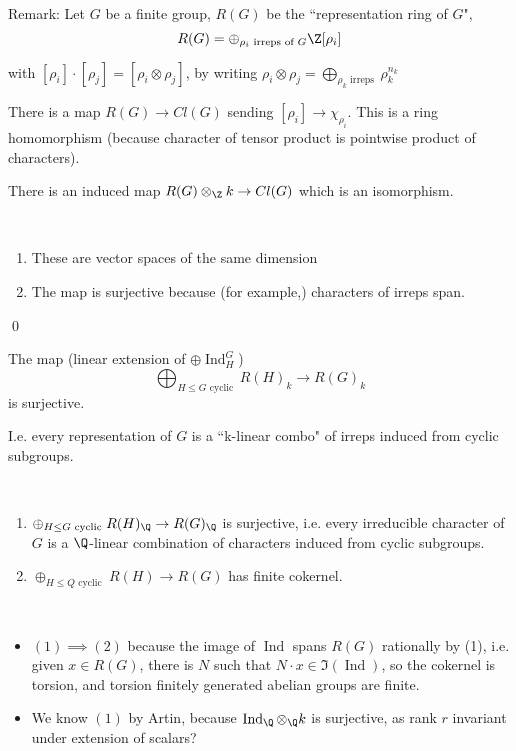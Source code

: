 \documentclass[x11names,reqno,14pt]{extarticle}
\DeclareMathOperator{\Ind}{Ind}
\begin{document}
Remark: Let $G$ be a finite group, $R(G)$ be the ``representation ring of $G$", 
\[
R(G) = \oplus_{\rho_i\text{ irreps of }G}\Z[\rho_i]
\]

with $[\rho_i]\cdot[\rho_j] = [\rho_i\otimes\rho_j]$, by writing $\rho_i\otimes\rho_j = \bigoplus_{\rho_k\text{ irreps }}\rho_k^{n_k}$

\prop

There is a map $R(G) \to Cl(G)$ sending $[\rho_i] \to \chi_{\rho_i}$. This is a ring homomorphism (because character of tensor product is pointwise product of characters).

There is an induced map $R(G) \otimes_{\Z}k \to Cl(G)$ which is an isomorphism. 

\proof

\,
\begin{enumerate}

\item These are vector spaces of the same dimension

\item The map is surjective because (for example,) characters of irreps span. 
\end{enumerate}

\qed


The map (linear extension of $\oplus\Ind_H^G$)
\[
\bigoplus_{H\leq G\text{ cyclic }}R(H)_k\to R(G)_k
\]
is surjective.

I.e. every representation of $G$ is a ``k-linear combo" of irreps induced from cyclic subgroups. 

\cor
\,
\begin{enumerate}

\item $\oplus_{H\leq G\text{ cyclic }} R(H)_\Q\to R(G)_\Q$ is surjective, i.e. every irreducible character of $G$ is a $\Q$-linear combination of characters induced from cyclic subgroups.

\item $\oplus_{H\leq Q \text{ cyclic }}R(H)\to R(G)$ has finite cokernel.

\end{enumerate}

\proof
\,
\begin{itemize}

\item $(1)\implies(2)$ because the image of $\Ind$ spans $R(G)$ rationally by (1), i.e. given $x \in R(G)$, there is $N$ such that $N\cdot x \in \Im(\Ind)$, so the cokernel is torsion, and torsion finitely generated abelian groups are finite. 

\item We know $(1)$ by Artin, because $\Ind_\Q\otimes_\Q k$ is surjective, as rank $r$ invariant under extension of scalars?

\end{itemize}
\end{document}
